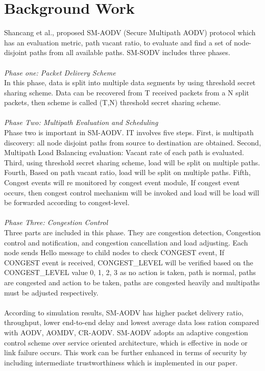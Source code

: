 \documentclass[journal]{IEEEtran}
\begin{document}
\section{Background Work}
Shancang et al., \cite{SMAODV} proposed SM-AODV (Secure Multipath AODV) protocol which has an evaluation metric, path vacant ratio, to evaluate and find a set of node-disjoint paths from all available paths. SM-SODV includes three phases.\\ \\
\textit{Phase one: Packet Delivery Scheme}\\ 
\indent In this phase, data is split into multiple data segments by using threshold secret sharing scheme. Data can be recovered from T received packets from a N split packets, then scheme is called (T,N) threshold secret sharing scheme.\\ \\
\textit{Phase Two: Multipath Evaluation and Scheduling}\\
\indent Phase two is important in SM-AODV. IT involves five steps. First, is multipath discovery: all node disjoint paths from source to destination are obtained. Second, Multipath Load Balancing evaluation: Vacant rate of each path is evaluated. Third, using threshold secret sharing scheme, load will be split on multiple paths. Fourth, Based on path vacant ratio, load will be split on multiple paths. Fifth, Congest events will re monitored by congest event module, If congest event occurs, then congest control mechanism will be invoked and load will be load will be forwarded according to congest-level.\\ \\  
\textit{Phase Three: Congestion Control}\\
\indent Three parts are included in this phase. They are congestion detection, Congestion control and notification,  and congestion cancellation and load adjusting. Each node sends Hello message to child nodes to check CONGEST event, If CONGEST event is received, CONGEST\_LEVEL will be verified based on the CONGEST\_LEVEL value 0, 1, 2, 3 as no action is taken, path is normal, paths are congested and action to be taken, paths are congested heavily and multipaths must be adjusted respectively. \\ \\
\indent According to simulation results, SM-AODV has higher packet delivery ratio, throughput, lower end-to-end delay and lowest average data loss ration compared with AODV, AOMDV, CR-AODV. SM-AODV adopts an adaptive congestion control scheme over service oriented architecture, which is effective in node or link failure occurs. This work can be further enhanced in terms of security by including intermediate trustworthiness which is implemented in our paper.
\end{document}
